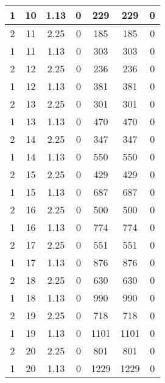 \documentclass[letterpaper, 12pt]{article}
\begin{document}
\begin{longtable}{|c|c|c|c|c|c|c|}
\hline
1 & 10 & 1.13 & 0 & 229 & 229 & 0 \\
\hline
2 & 11 & 2.25 & 0 & 185 & 185 & 0 \\
\hline
1 & 11 & 1.13 & 0 & 303 & 303 & 0 \\
\hline
2 & 12 & 2.25 & 0 & 236 & 236 & 0 \\
\hline
1 & 12 & 1.13 & 0 & 381 & 381 & 0 \\
\hline
2 & 13 & 2.25 & 0 & 301 & 301 & 0 \\
\hline
1 & 13 & 1.13 & 0 & 470 & 470 & 0 \\
\hline
2 & 14 & 2.25 & 0 & 347 & 347 & 0 \\
\hline
1 & 14 & 1.13 & 0 & 550 & 550 & 0 \\
\hline
2 & 15 & 2.25 & 0 & 429 & 429 & 0 \\
\hline
1 & 15 & 1.13 & 0 & 687 & 687 & 0 \\
\hline
2 & 16 & 2.25 & 0 & 500 & 500 & 0 \\
\hline
1 & 16 & 1.13 & 0 & 774 & 774 & 0 \\
\hline
2 & 17 & 2.25 & 0 & 551 & 551 & 0 \\
\hline
1 & 17 & 1.13 & 0 & 876 & 876 & 0 \\
\hline
2 & 18 & 2.25 & 0 & 630 & 630 & 0 \\
\hline
1 & 18 & 1.13 & 0 & 990 & 990 & 0 \\
\hline
2 & 19 & 2.25 & 0 & 718 & 718 & 0 \\
\hline
1 & 19 & 1.13 & 0 & 1101 & 1101 & 0 \\
\hline
2 & 20 & 2.25 & 0 & 801 & 801 & 0 \\
\hline
1 & 20 & 1.13 & 0 & 1229 & 1229 & 0 \\
\hline
\end{longtable}
\end{document}
